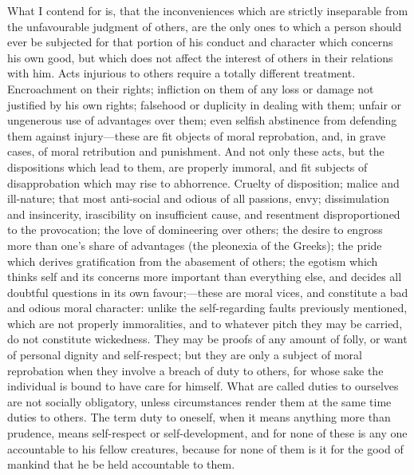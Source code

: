 \documentclass[11pt,openany]{book}
\begin{document}
What I contend for is, that the inconveniences which are strictly inseparable from the unfavourable judgment of others, are the only ones to which a person should ever be subjected for that portion of his conduct and character which concerns his own good, but which does not affect the interest of others in their relations with him. Acts injurious to others require a totally different treatment. Encroachment on their rights; infliction on them of any loss or damage not justified by his own rights; falsehood or duplicity in dealing with them; unfair or ungenerous use of advantages over them; even selfish abstinence from defending them against injury---these are fit objects of moral reprobation, and, in grave cases, of moral retribution and punishment. And not only these acts, but the dispositions which lead to them, are properly immoral, and fit subjects of disapprobation which may rise to abhorrence. Cruelty of disposition; malice and ill-nature; that most anti-social and odious of all passions, envy; dissimulation and insincerity, irascibility on insufficient cause, and resentment disproportioned to the provocation; the love of domineering over others; the desire to engross more than one's share of advantages (the pleonexia of the Greeks); the pride which derives gratification from the abasement of others; the egotism which thinks self and its concerns more important than everything else, and decides all doubtful questions in its own favour;---these are moral vices, and constitute a bad and odious moral character: unlike the self-regarding faults previously mentioned, which are not properly immoralities, and to whatever pitch they may be carried, do not constitute wickedness. They may be proofs of any amount of folly, or want of personal dignity and self-respect; but they are only a subject of moral reprobation when they involve a breach of duty to others, for whose sake the individual is bound to have care for himself. What are called duties to ourselves are not socially obligatory, unless circumstances render them at the same time duties to others. The term duty to oneself, when it means anything more than prudence, means self-respect or self-development, and for none of these is any one accountable to his fellow creatures, because for none of them is it for the good of mankind that he be held accountable to them.
\end{document}
